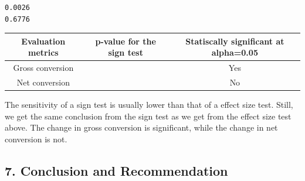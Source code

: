 \documentclass[11pt]{article}
\begin{document}
    \begin{Verbatim}[commandchars=\\\{\}]
0.0026
0.6776
    \end{Verbatim}

    \begin{longtable}[]{@{}ccc@{}}
\toprule
\begin{minipage}[b]{0.21\columnwidth}\centering
Evaluation metrics\strut
\end{minipage} & \begin{minipage}[b]{0.29\columnwidth}\centering
p-value for the sign test\strut
\end{minipage} & \begin{minipage}[b]{0.42\columnwidth}\centering
Statiscally significant at alpha=0.05\strut
\end{minipage}\tabularnewline
\midrule
\endhead
\begin{minipage}[t]{0.21\columnwidth}\centering
Gross conversion\strut
\end{minipage} & \begin{minipage}[t]{0.29\columnwidth}\centering
0.0026\strut
\end{minipage} & \begin{minipage}[t]{0.42\columnwidth}\centering
Yes\strut
\end{minipage}\tabularnewline
\begin{minipage}[t]{0.21\columnwidth}\centering
Net conversion\strut
\end{minipage} & \begin{minipage}[t]{0.29\columnwidth}\centering
0.6776\strut
\end{minipage} & \begin{minipage}[t]{0.42\columnwidth}\centering
No\strut
\end{minipage}\tabularnewline
\bottomrule
\end{longtable}

    The sensitivity of a sign test is usually lower than that of a effect
size test. Still, we get the same conclusion from the sign test as we
get from the effect size test above. The change in gross conversion is
significant, while the change in net conversion is not.

    \hypertarget{conclusion-and-recommendation}{%
\subsection{7. Conclusion and
Recommendation}\label{conclusion-and-recommendation}}
\end{document}
